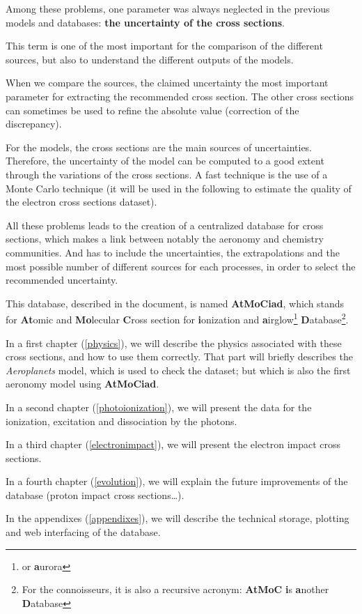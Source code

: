 Among these problems, one parameter was always neglected in the previous models and databases: \textbf{the uncertainty of the cross sections}.

This term is one of the most important for the comparison of the different sources, but also to understand the different outputs of the models.

When we compare the sources, the claimed uncertainty the most important parameter for extracting the recommended cross section. The other cross sections can sometimes be used to refine the absolute value (correction of the discrepancy).

For the models, the cross sections are the main sources of uncertainties. Therefore, the uncertainty of the model can be computed to a good extent through the variations of the cross sections. A fast technique is the use of a Monte Carlo technique (it will be used in the following to estimate the quality of the electron cross sections dataset).


All these problems leads to the creation of a centralized database for cross sections, which makes a link between notably the aeronomy and chemistry communities. And has to include  the uncertainties,  the extrapolations and the most possible number of different sources for each processes, in order to select the recommended uncertainty.

This database, described in the document, is named \textbf{AtMoCiad}, which stands for \textbf{At}omic and \textbf{Mo}lecular \textbf{C}ross section for \textbf{i}onization and \textbf{a}irglow\footnote{or \textbf{a}urora} \textbf{D}atabase\footnote{For the connoisseurs, it is also a recursive acronym: \textbf{AtMoC} \textbf{i}s \textbf{a}nother \textbf{D}atabase}.



In a first chapter (\ref{physics}), we will describe the physics associated with these cross sections, and how to use them correctly. That part will briefly describes the \textit{Aeroplanets} model, which is used to check the dataset; but which is also the first aeronomy model using \textbf{AtMoCiad}.

In a second chapter (\ref{photoionization}), we will present the data for the ionization, excitation and dissociation by the photons.

In a third chapter (\ref{electronimpact}), we will present the electron impact cross sections.

In a fourth chapter (\ref{evolution}), we will explain the future improvements of the database (proton impact cross sections\ldots).


In the appendixes (\ref{appendixes}), we will describe the technical storage, plotting and web interfacing of the database.




